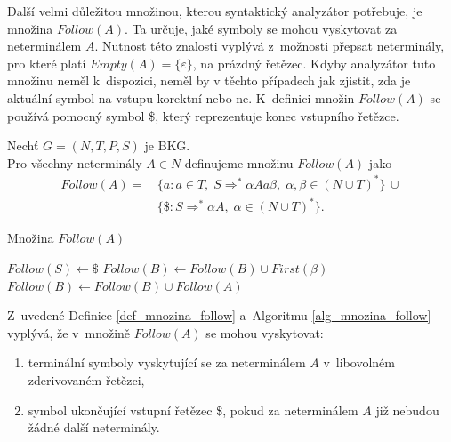 Další velmi důležitou množinou, kterou syntaktický analyzátor potřebuje, je množina $Follow(A)$.
Ta určuje, jaké symboly se mohou vyskytovat za neterminálem $A$.
Nutnost této znalosti vyplývá z~možnosti přepsat neterminály, pro které platí $Empty(A) = \{\varepsilon\}$, na prázdný řetězec.
Kdyby analyzátor tuto množinu neměl k~dispozici, neměl by v těchto případech jak zjistit, zda je aktuální symbol na vstupu korektní nebo ne.
K~definici množin $Follow(A)$ se používá pomocný symbol \$, který reprezentuje konec vstupního řetězce.
\begin{definition}\label{def_mnozina_follow}
    Nechť $G = (N, T, P, S)$ je BKG.\\
    Pro všechny neterminály $A \in N$ definujeme množinu $Follow(A)$ jako
    \begin{align*}
        Follow(A) = \,&\{a: a \in T,\; S \Rightarrow^* \alpha Aa\beta,\; \alpha, \beta \in (N \cup T)^*\}\, \cup \\
                      &\{\$: S \Rightarrow^* \alpha A,\; \alpha \in (N \cup T)^*\}.
    \end{align*}
\end{definition}
\begin{algorithm}[h!]
    \caption{Množina $Follow(A)$}
    \label{alg_mnozina_follow}
    \begin{algorithmic}[1]
        \NewLine
        \State $Follow(S) \gets \$$
                \If{$\beta \neq \varepsilon$}
                    \State $Follow(B) \gets Follow(B) \cup First(\beta)$
                \EndIf
                    \State $Follow(B) \gets Follow(B) \cup Follow(A)$
                \EndIf
            \EndIf
        \EndWhile 
    \end{algorithmic}
\end{algorithm}

Z~uvedené Definice \ref{def_mnozina_follow} a~Algoritmu \ref{alg_mnozina_follow} vyplývá, že v~množině $Follow(A)$ se mohou vyskytovat:
\begin{enumerate}
    \item terminální symboly vyskytující se za neterminálem $A$ v~libovolném zderivovaném řetězci,
    \item symbol ukončující vstupní řetězec \$, pokud za neterminálem $A$ již nebudou žádné další neterminály. 
\end{enumerate}

